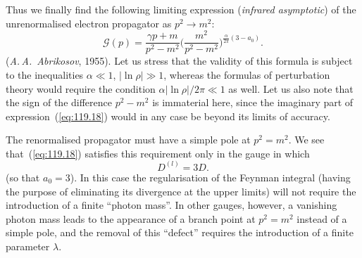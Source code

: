 
Thus we finally find the following limiting expression (\emph{infrared asymptotic}) of the unrenormalised electron propagator as $p^2 \to m^2$:
\begin{equation}
\mathcal{G}(p) = \frac{\gamma p + m}{p^2 - m^2}\bigg(\frac{m^2}{p^2 - m^2}\bigg)^{\frac{\alpha}{2\pi}(3 - a_0)}.
\label{eq:119.18}
\end{equation}
(\emph{A.\,A.~Abrikosov}, 1955). Let us stress that the validity of this formula is subject to the inequalities $\alpha \ll 1$, $|\ln\rho| \gg 1$, whereas the formulas of perturbation theory would require the condition $\alpha|\ln\rho|/2\pi \ll 1$ as well. Let us also note that the sign of the difference $p^2 - m^2$ is immaterial here, since the imaginary part of expression~(\ref{eq:119.18}) would in any case be beyond its limits of accuracy.

The renormalised propagator must have a simple pole at $p^2 = m^2$. We see that~(\ref{eq:119.18}) satisfies this requirement only in the gauge in which
\begin{equation}
D^{(l)} = 3D.
\label{eq:119.19}
\end{equation}
(so that $a_0 = 3$). In this case the regularisation of the Feynman integral (having the purpose of eliminating its divergence at the upper limits) will not require the introduction of a finite ``photon mass''. In other gauges, however, a vanishing photon mass leads to the appearance of a branch point at $p^2 = m^2$ instead of a simple pole, and the removal of this ``defect'' requires the introduction of a finite parameter $\lambda$.
